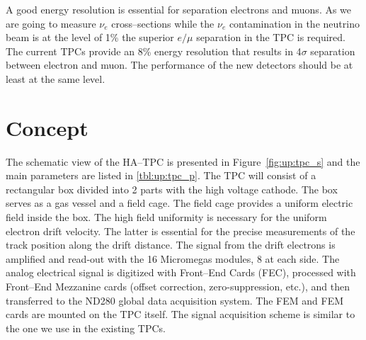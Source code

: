 \documentclass[../main.tex]{subfiles}
\begin{document}
A good energy resolution is essential for separation electrons and muons. As we are going to measure $\nu_e$ cross--sections while the $\nu_e$ contamination in the neutrino beam is at the level of 1\% the superior $e/\mu$ separation in the TPC is required. The current TPCs provide an 8\% energy resolution that results in 4$\sigma$ separation between electron and muon. The performance of the new detectors should be at least at the same level.

\section{Concept}
The schematic view of the HA--TPC is presented in Figure~\ref{fig:up:tpc_s} and the main parameters are listed in \autoref{tbl:up:tpc_p}. The TPC will consist of a rectangular box divided into 2 parts with the high voltage cathode. The box serves as a gas vessel and a field cage. The field cage provides a uniform electric field inside the box. The high field uniformity is necessary for the uniform electron drift velocity. The latter is essential for the precise measurements of the track position along the drift distance. The signal from the drift electrons is amplified and read-out with the 16 Micromegas modules, 8 at each side. The analog electrical signal is digitized with Front--End Cards (FEC), processed with Front--End Mezzanine cards (offset correction, zero-suppression, etc.), and then transferred to the ND280 global data acquisition system. The FEM and FEM cards are mounted on the TPC itself. The signal acquisition scheme is similar to the one we use in the existing TPCs.
\end{document}
